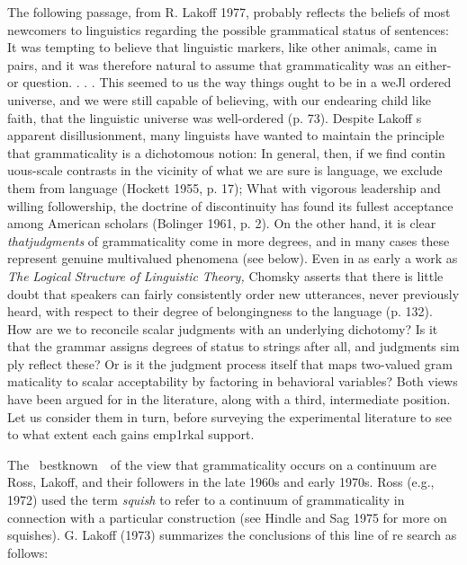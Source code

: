 \begin{styleStandard}
The following passage, from R. Lakoff 1977, probably reflects the beliefs of most newcomers to linguistics regarding the possible grammatical status of sentences: {\textquotedbl}It was tempting to believe that linguistic markers, like other animals, came in pairs, and it was therefore natural to assume that grammaticality was an either-or question. . . . This seemed to us the way things ought to be in a weJl\- ordered universe, and we were still capable of believing, with our endearing child\- like faith, that the linguistic universe was well-ordered{\textquotedbl} (p. 73). Despite Lakoff {\textquotesingle}s apparent disillusionment, many linguists have wanted to maintain the principle that grammaticality is a dichotomous notion: {\textquotedbl}In general, then, if we find contin\- uous-scale contrasts in the vicinity of what we are sure is language, we exclude them from language{\textquotedbl} (Hockett 1955, p. 17); {\textquotedbl}What with vigorous leadership and willing followership, the doctrine of discontinuity has found its fullest acceptance among American scholars{\textquotedbl} (Bolinger 1961, p. 2). On the other hand, it is clear \textit{tha}\textit{t}\textit{judgments}\textit{ }of grammaticality come in more degrees, and in many cases these represent genuine multivalued phenomena (see below). Even in as early a work as \textit{The}\textit{ }\textit{Logical}\textit{ }\textit{Structure}\textit{ }\textit{of}\textit{ }\textit{Linguistic}\textit{ }\textit{Theory,}\textit{ }Chomsky asserts that {\textquotedbl}there is little doubt that speakers can fairly consistently order new utterances, never previously heard, with respect to their degree of {\textquotesingle}belongingness{\textquotesingle} to the language{\textquotedbl} (p. 132). How are we to reconcile scalar judgments with an underlying dichotomy? Is it that the grammar assigns degrees of status to strings after all, and judgments sim\- ply reflect these? Or is it the judgment process itself that maps two-valued gram\- maticality to scalar acceptability by factoring in behavioral variables? Both views have been argued for in the literature, along with a third, intermediate position. Let us consider them in turn, before surveying the experimental literature to see to what extent each gains emp1rkal support.
\end{styleStandard}


\begin{styleStandard}
The \ bestknown\ \ of the view that grammaticality occurs on a continuum are Ross, Lakoff, and their followers in the late 1960s and early 1970s. Ross (e.g., 1972) used the term \textit{squish}\textit{ }to refer to a continuum of grammaticality in connection with a particular construction (see Hindle and Sag 1975 for more on squishes). G. Lakoff (1973) summarizes the conclusions of this line of re\- search as follows:
\end{styleStandard}


